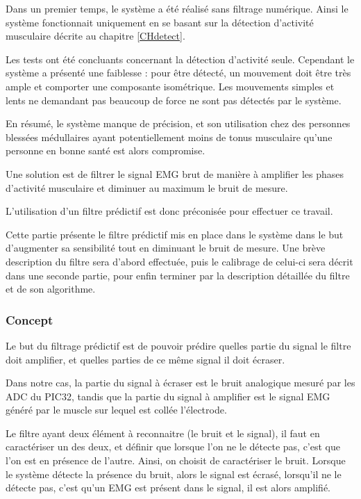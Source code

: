\documentclass[letterpaper, twoside, 12pt, memoire, creativecommons, hyperref]{thETS}
\begin{document}
Dans un premier temps, le système a été réalisé sans filtrage numérique. Ainsi le système fonctionnait uniquement en se basant sur la détection d'activité musculaire décrite au chapitre \ref{CHdetect}.

Les tests ont été concluants concernant la détection d'activité seule. Cependant le système a présenté une faiblesse : pour être détecté, un mouvement doit être très ample et comporter une composante isométrique. Les mouvements simples et lents ne demandant pas beaucoup de force ne sont pas détectés par le système. 

En résumé, le système manque de précision, et son utilisation chez des personnes blessées médullaires ayant potentiellement moins de tonus musculaire qu'une personne en bonne santé est alors compromise. 

Une solution est de filtrer le signal EMG brut de manière à amplifier les phases d'activité musculaire et diminuer au maximum le bruit de mesure. 

L'utilisation d'un filtre prédictif est donc préconisée pour effectuer ce travail. 

Cette partie présente le filtre prédictif mis en place dans le système dans le but d'augmenter sa sensibilité tout en diminuant le bruit de mesure. Une brève description du filtre sera d'abord effectuée, puis le calibrage de celui-ci sera décrit dans une seconde partie, pour enfin terminer par la description détaillée du filtre et de son algorithme.

\subsubsection{Concept}

Le but du filtrage prédictif est de pouvoir prédire quelles partie du signal le filtre doit amplifier, et quelles parties de ce même signal il doit écraser.

Dans notre cas, la partie du signal à écraser est le bruit analogique mesuré par les ADC du PIC32, tandis que la partie du signal à amplifier est le signal EMG généré par le muscle sur lequel est collée l'électrode.

Le filtre ayant deux élément à reconnaitre (le bruit et le signal), il faut en caractériser un des deux, et définir que lorsque l'on ne le détecte pas, c'est que l'on est en présence de l'autre. Ainsi, on choisit de caractériser le bruit. Lorsque le système détecte la présence du bruit, alors le signal est écrasé, lorsqu'il ne le détecte pas, c'est qu'un EMG est présent dans le signal, il est alors amplifié.
\end{document}
